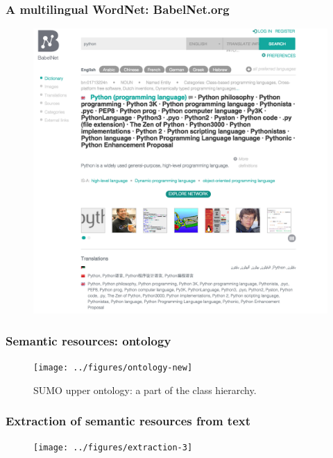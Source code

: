 \begin{frame}
\frametitle{A multilingual WordNet: BabelNet.org}

\begin{figure}
\centering
\includegraphics[height=0.7\textwidth]{./figures/babelnet2}
\end{figure}

\end{frame}





\begin{frame}
\frametitle{Semantic resources: ontology }

\begin{figure}
    \centering
        \texttt{[image: ../figures/ontology-new]}
    \caption{ SUMO upper ontology: a part of the class hierarchy.}
    \label{fig:sumo}
\end{figure}
\end{frame}





\begin{frame}
\frametitle{Extraction of semantic resources from text }

\begin{figure}
\centering
\texttt{[image: ../figures/extraction-3]}

\label{fig:semantic-relations-extraction}
\end{figure}

\end{frame}






